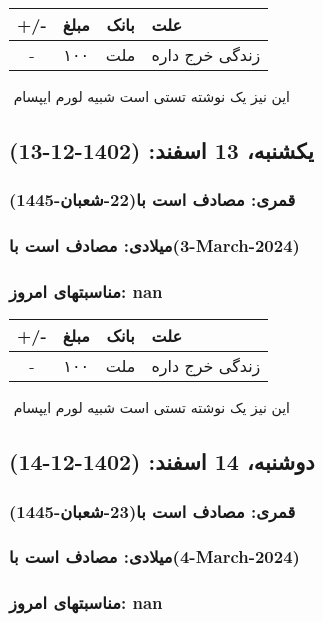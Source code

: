 \documentclass{article}
\newcommand{\rnote}[1]{\marginpar{\textcolor{color}{\StrSubstitute{\##1}{ }{\_}}}}
\newcommand{\myRow}[4]{
    #1 & #2 & #3 & #4 \\ \hline
}
\begin{document}
\begin{tabular}{ | c | c | c | p{5cm} |}
    \hline
    \myRow{ +/- }{مبلغ}{بانک}{علت}
    \myRow{-}{۱۰۰}{ملت}{زندگی خرج داره}
\end{tabular}
\newline
\newline

‌
\rnote{تست}
این نیز یک نوشته تستی است شبیه لورم ایپسام




\newpage
{}
\textcolor{color}{
\section{ یکشنبه، 13 اسفند: (1402-12-13) }
\subsubsection*{قمری: مصادف است با(22-شعبان-1445)} 
\subsubsection*{میلادی: مصادف است با(3-March-2024)}
\subsubsection*{مناسبتهای امروز: nan}
}


\begin{tabular}{ | c | c | c | p{5cm} |}
    \hline
    \myRow{ +/- }{مبلغ}{بانک}{علت}
    \myRow{-}{۱۰۰}{ملت}{زندگی خرج داره}
\end{tabular}
\newline
\newline

‌
\rnote{تست}
این نیز یک نوشته تستی است شبیه لورم ایپسام




\newpage
{}
\textcolor{color}{
\section{ دوشنبه، 14 اسفند: (1402-12-14) }
\subsubsection*{قمری: مصادف است با(23-شعبان-1445)} 
\subsubsection*{میلادی: مصادف است با(4-March-2024)}
\subsubsection*{مناسبتهای امروز: nan}
}
\end{document}
